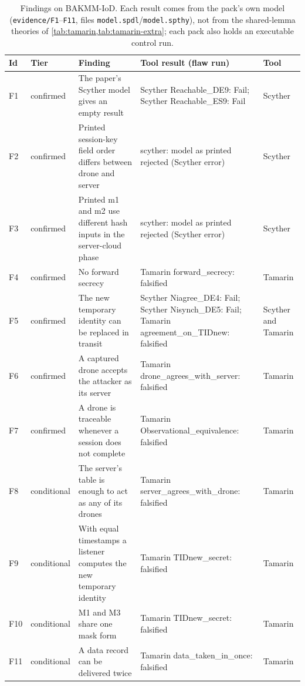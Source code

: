 \begin{table}[!t]
\centering
\footnotesize
\caption{Findings on BAKMM-IoD. Each result comes from the pack's own model (\texttt{evidence/F1}--\texttt{F11}, files \texttt{model.spdl}/\texttt{model.spthy}), not from the shared-lemma theories of \cref{tab:tamarin,tab:tamarin-extra}; each pack also holds an executable control run.}
\label{tab:flaws}
\setlength{\tabcolsep}{3pt}
\begin{tabular}{p{0.6cm}p{1.6cm}p{4.2cm}p{5.2cm}p{2.0cm}}
\toprule
Id & Tier & Finding & Tool result (flaw run) & Tool \\
\midrule
F1 & confirmed & The paper's Scyther model gives an empty result & Scyther Reachable\_DE9: Fail; Scyther Reachable\_ES9: Fail & Scyther \\
F2 & confirmed & Printed session-key field order differs between drone and server & scyther: model as printed rejected (Scyther error) & Scyther \\
F3 & confirmed & Printed m1 and m2 use different hash inputs in the server-cloud phase & scyther: model as printed rejected (Scyther error) & Scyther \\
F4 & confirmed & No forward secrecy & Tamarin forward\_secrecy: falsified & Tamarin \\
F5 & confirmed & The new temporary identity can be replaced in transit & Scyther Niagree\_DE4: Fail; Scyther Nisynch\_DE5: Fail; Tamarin agreement\_on\_TIDnew: falsified & Scyther and Tamarin \\
F6 & confirmed & A captured drone accepts the attacker as its server & Tamarin drone\_agrees\_with\_server: falsified & Tamarin \\
F7 & confirmed & A drone is traceable whenever a session does not complete & Tamarin Observational\_equivalence: falsified & Tamarin \\
F8 & conditional & The server's table is enough to act as any of its drones & Tamarin server\_agrees\_with\_drone: falsified & Tamarin \\
F9 & conditional & With equal timestamps a listener computes the new temporary identity & Tamarin TIDnew\_secret: falsified & Tamarin \\
F10 & conditional & M1 and M3 share one mask form & Tamarin TIDnew\_secret: falsified & Tamarin \\
F11 & conditional & A data record can be delivered twice & Tamarin data\_taken\_in\_once: falsified & Tamarin \\
\bottomrule
\end{tabular}
\end{table}

